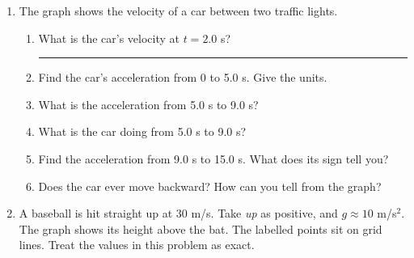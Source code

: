 \documentclass[12pt, twoside]{article}
\newcommand{\blank}[1][2.4cm]{\rule{#1}{0.4pt}}
\begin{document}
\begin{enumerate}[itemsep=0.6cm]
\newpage

\item The graph shows the velocity of a car between two traffic lights.

  \begin{center}
  \end{center}

  \begin{enumerate}[itemsep=0.4cm]
    \item What is the car's velocity at $t = 2.0$ s? \hfill \blank
      \vspace{0.4cm}
    \item Find the car's acceleration from 0 to 5.0 s. Give the units.
      \vspace{2.2cm}
    \item What is the acceleration from 5.0 s to 9.0 s?
      \vspace{0.8cm}
    \item What is the car doing from 5.0 s to 9.0 s?
      \vspace{0.8cm}
    \item Find the acceleration from 9.0 s to 15.0 s. What does its sign tell you?
      \vspace{2.2cm}
    \item Does the car ever move backward? How can you tell from the graph?
  \end{enumerate}

\newpage

\item A baseball is hit straight up at 30 m/s. Take \emph{up} as positive, and
  $g \approx 10$ m/s$^2$. The graph shows its height above the bat. The labelled
  points sit on grid lines. Treat the values in this problem as exact.


\end{enumerate}
\end{document}
